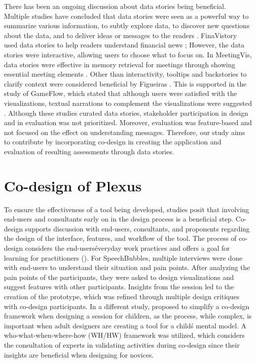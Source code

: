 \documentclass{sigchi}
\begin{document}
There has been an ongoing discussion about data stories being beneficial. Multiple studies have concluded that data stories were seen as a powerful way to summarize various information, to subtly explore data, to discover new questions about the data, and to deliver ideas or messages to the readers \cite{Pavel2013} \cite{Layton2014}. FinaVistory used data stories to help readers understand financial news \cite{Chan2016}; However, the data stories were interactive, allowing users to choose what to focus on. In MeetingVis, data stories were effective in memory retrieval for meetings through showing essential meeting elements \cite{Shi2018}. Other than interactivity, tooltips and backstories to clarify context were considered beneficial by Figueiras \cite{Figueiras2014}. This is supported in the study of GameFlow, which stated that although users were satisfied with the visualizations, textual narrations to complement the visualizations were suggested \cite{Chen2016}. Although these studies curated data stories, stakeholder participation in design and in evaluation was not prioritized. Moreover, evaluation was feature-based and not focused on the effect on understanding messages. Therefore, our study aims to contribute by incorporating co-design in creating the application and evaluation of resulting assessments through data stories. 

\section{Co-design of Plexus}

To ensure the effectiveness of a tool being developed, studies posit that involving end-users and consultants early on in the design process is a beneficial step. Co-design supports discussion with end-users, consultants, and  proponents regarding the design of the interface, features, and workflow of the tool. The process of co-design considers the end-users\' everyday work practices and offers a goal for learning for practitioners  (\cite{roschelle:2006}). For SpeechBubbles, multiple interviews were done with end-users to understand their situation and pain points. After analyzing the pain points of the participants, they were asked to design visualizations and suggest features with other participants. Insights from the session led to the creation of the prototype, which was refined through multiple design critiques with co-design participants. In a different study, \cite{mazzone:2011}  proposed to simplify a co-design framework when designing a session for children, as the process, while complex, is important when adult designers are creating a tool for a child\'s mental model.  A who-what-when-where-how (WH/HW) framework was utilized, which considers the consultation of experts in validating activities during co-design since their insights are beneficial when designing for novices.
\end{document}
